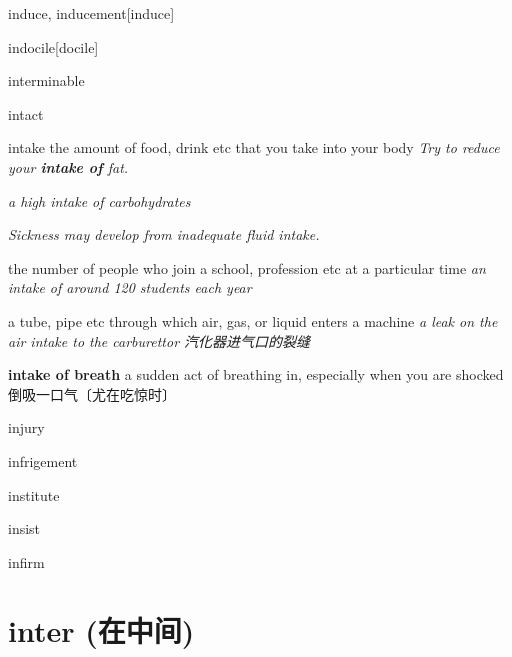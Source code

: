 \begin{RefWord}{induce, inducement}[induce]
\end{RefWord}

\begin{RefWord}{indocile}[docile]
\end{RefWord}

\begin{RefWord}{interminable}
\end{RefWord}

\begin{RefWord}{intact}
\end{RefWord}

\begin{RefWord}{intake}
    the amount of food, drink etc that you take into your body
    \textit{Try to reduce your \textbf{intake of} fat.}

    \textit{a high intake of carbohydrates}

    \textit{Sickness may develop from inadequate fluid intake.}

    the number of people who join a school, profession etc at a particular time
    \textit{an intake of around 120 students each year}

    a tube, pipe etc through which air, gas, or liquid enters a machine
    \textit{a leak on the air intake to the carburettor 汽化器进气口的裂缝}

    \textbf{intake of breath} a sudden act of breathing in, especially when you are shocked倒吸一口气〔尤在吃惊时〕
\end{RefWord}

\begin{RefWord}{injury}
\end{RefWord}

\begin{RefWord}{infrigement}
\end{RefWord}

\begin{RefWord}{institute}
\end{RefWord}

\begin{RefWord}{insist}
\end{RefWord}

\begin{RefWord}{infirm}
\end{RefWord}


\section{inter (在中间)}

